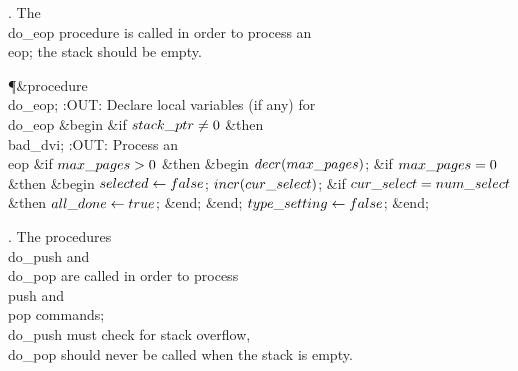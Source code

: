 . The \\{do\_eop} procedure is called in order to process an \\{eop};
the stack should be empty.

\Y\P\4\&{procedure}\1\  \\{do\_eop};\6
:OUT: Declare local variables (if any) for \\{do\_eop}\X\2\6
\&{begin} \&{if} $\\{stack\_ptr}\ne0$ \1\&{then}\5
\\{bad\_dvi};\2\6
:OUT: Process an \\{eop}\X\6
\&{if} $\\{max\_pages}>0$ \1\&{then}\6
\&{begin} $\\{decr}(\\{max\_pages})$;\6
\&{if} $\\{max\_pages}=0$ \1\&{then}\6
\&{begin} $\\{selected}\gets\\{false}$;\5
$\\{incr}(\\{cur\_select})$;\6
\&{if} $\\{cur\_select}=\\{num\_select}$ \1\&{then}\5
$\\{all\_done}\gets\\{true}$;\2\6
\&{end};\2\6
\&{end};\2\6
$\\{type\_setting}\gets\\{false}$;\6
\&{end};\par
\fi

. The procedures \\{do\_push} and \\{do\_pop} are called in order to
process
\\{push} and \\{pop} commands; \\{do\_push} must check for stack overflow,
\\{do\_pop} should never be called when the stack is empty.

